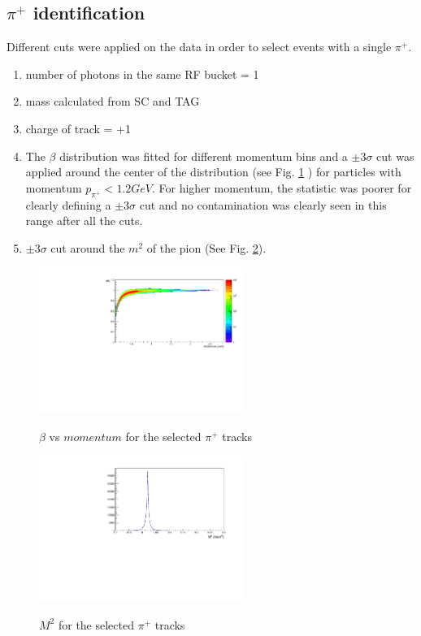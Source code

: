 \subsection{\texorpdfstring{$\pi^+$}{pi+} identification}
Different cuts were applied on the data in order to select events with a single $\pi^+$.
\begin{enumerate}
  \item number of photons in the same RF bucket = 1
  \item mass calculated from SC and TAG
  \item charge of track = +1
  \item The $\beta$ distribution was fitted for different momentum bins and a $\pm 3 \sigma$ cut was applied around the center of the distribution (see Fig. \ref{fig:beta_mom_pip} ) for particles with momentum $p_{\pi^+} < 1.2GeV$. For higher momentum, the statistic was poorer for clearly defining a $\pm 3 \sigma$ cut and no contamination was clearly seen in this range after all the cuts.
  \item  $\pm 3 \sigma$ cut around the $m^2$ of the pion (See Fig. \ref{fig:mass2_pip}).
\end{enumerate}
\begin{figure}[!htb]
  \begin{center}
    \includegraphics[width=0.6\textwidth]{figures/pid_beta_mom_pip.pdf} \\
    \caption{$\beta$ vs $momentum$ for the selected $\pi^+$ tracks}
    \label{fig:beta_mom_pip}
  \end{center}
\end{figure}
\begin{figure}[!htb]
  \begin{center}
    \includegraphics[width=0.6\textwidth]{figures/pid_mass2_pip.pdf} \\
    \caption{$M^2$ for the selected $\pi^+$ tracks}
    \label{fig:mass2_pip}
  \end{center}
\end{figure}

